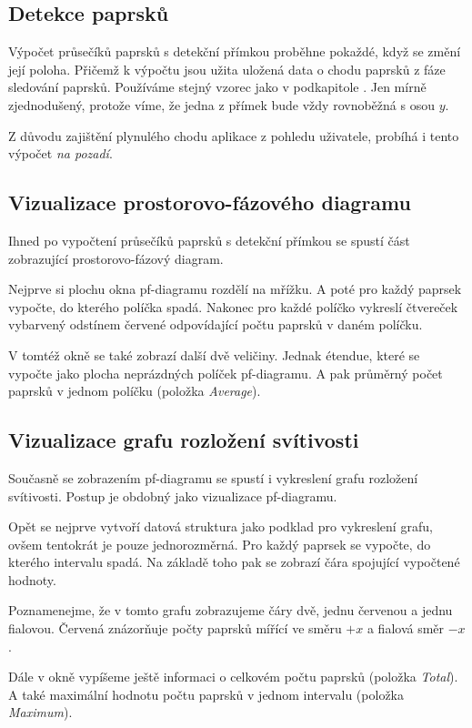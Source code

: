 \subsection{Detekce paprsků}

Výpočet průsečíků paprsků s detekční přímkou proběhne pokaždé, když se změní její poloha. Přičemž k výpočtu jsou užita uložená data o chodu paprsků z fáze sledování paprsků. Používáme stejný vzorec jako v podkapitole . Jen mírně zjednodušený, protože víme, že jedna z přímek bude vždy rovnoběžná s osou $y$.

Z důvodu zajištění plynulého chodu aplikace z pohledu uživatele, probíhá i tento výpočet \emph{na pozadí}.


\subsection{Vizualizace prostorovo-fázového diagramu}

Ihned po vypočtení průsečíků paprsků s detekční přímkou se spustí část zobrazující prostorovo-fázový diagram.

Nejprve si plochu okna pf-diagramu rozdělí na mřížku. A poté pro každý paprsek vypočte, do kterého políčka spadá. Nakonec pro každé políčko vykreslí čtvereček vybarvený odstínem červené odpovídající počtu paprsků v daném políčku.

V tomtéž okně se také zobrazí další dvě veličiny. Jednak étendue, které se vypočte jako plocha neprázdných políček pf-diagramu. A pak průměrný počet paprsků v jednom políčku (položka \emph{Average}).


\subsection{Vizualizace grafu rozložení svítivosti}

Současně se zobrazením pf-diagramu se spustí i vykreslení grafu rozložení svítivosti. Postup je obdobný jako vizualizace pf-diagramu.

Opět se nejprve vytvoří datová struktura jako podklad pro vykreslení grafu, ovšem tentokrát je pouze jednorozměrná. Pro každý paprsek se vypočte, do kterého intervalu spadá. Na základě toho pak se zobrazí čára spojující vypočtené hodnoty.

Poznamenejme, že v tomto grafu zobrazujeme čáry dvě, jednu červenou a jednu fialovou. Červená znázorňuje počty paprsků mířící ve směru $+x$ a fialová směr $-x$.

Dále v okně vypíšeme ještě informaci o celkovém počtu paprsků (položka \emph{Total}). A také maximální hodnotu počtu paprsků v jednom intervalu (položka \emph{Maximum}).

